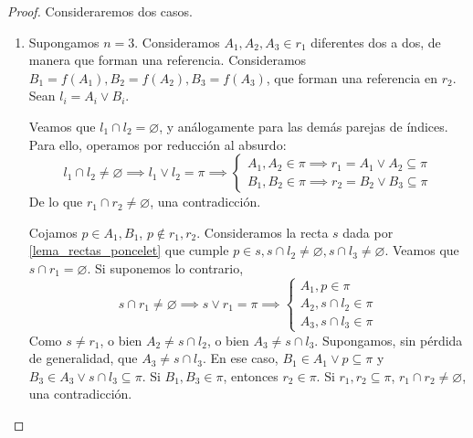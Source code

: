\begin{proof}
    Consideraremos dos casos.
    \begin{enumerate}
        \item Supongamos $n = 3$. Consideramos $A_1, A_2, A_3 \in
        r_1$ diferentes dos a dos, de manera que forman una
        referencia. Consideramos $B_1 = f(A_1), B_2 = f(A_2),
        B_3 = f(A_3)$, que forman una referencia en $r_2$.
        Sean $l_i = A_i \vee B_i$.
        
        Veamos que $l_1 \cap l_2 = \varnothing$, y análogamente
        para las demás parejas de índices. Para ello, operamos
        por reducción al absurdo:
        \[
        l_1 \cap l_2 \neq \varnothing \implies l_1 \vee l_2 = \pi
        \implies
        \begin{cases}
        A_1, A_2 \in \pi \implies r_1 = A_1 \vee A_2 \subseteq \pi\\
        B_1, B_2 \in \pi \implies r_2 = B_2 \vee B_3 \subseteq \pi
        \end{cases}
        \]
        De lo que $r_1 \cap r_2 \neq \varnothing$,
        una contradicción.
        
        Cojamos $p \in A_1, B_1$, $p \not \in r_1, r_2$. Consideramos
        la recta $s$ dada por \ref{lema_rectas_poncelet} que cumple
        $p \in s, s \cap l_2 \neq \varnothing, s \cap l_3 \neq 
        \varnothing$. Veamos que $s \cap r_1 = \varnothing$. Si 
        suponemos lo contrario,
        \[
        s \cap r_1 \neq \varnothing \implies s \vee r_1 = \pi
        \implies
        \begin{cases}
        A_1, p \in \pi \\
        A_2, s \cap l_2 \in \pi \\
         A_3, s \cap l_3 \in \pi 
        \end{cases}
        \]
        Como $s \neq r_1$, o bien $A_2 \neq s \cap l_2$, o bien 
         $A_3 \neq s \cap l_3$. Supongamos, sin pérdida de generalidad,
         que $A_3 \neq s \cap l_3$. En ese caso, $B_1 \in A_1 
         \vee p \subseteq \pi$ y $B_3 \in A_3 \vee s \cap l_3 \subseteq
         \pi$. Si $B_1, B_3 \in \pi$, 
         entonces $r_2 \in \pi$. Si $r_1, r_2 \subseteq
         \pi$, $r_1 \cap r_2 \neq \varnothing$, una contradicción.
         

\end{enumerate}
\end{proof}
